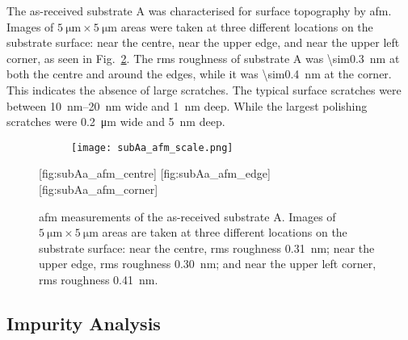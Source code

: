 The as-received substrate A was characterised for surface topography by \ac{afm}. Images of $\SI{5}{\micro\metre}\times\SI{5}{\micro\metre}$ areas were taken at three different locations on the substrate surface: near the centre, near the upper edge, and near the upper left corner, as seen in Fig.~\ref{fig:subAa_afm}. The \ac{rms} roughness of substrate A was \SI{\sim0.3}{\nano\metre} at both the centre and around the edges, while it was \SI{\sim0.4}{\nano\metre} at the corner. This indicates the absence of large scratches. The typical surface scratches were between \SIrange{10}{20}{\nano\metre} wide and \SI{1}{\nano\metre} deep. While the largest polishing scratches were \SI{0.2}{\micro\metre} wide and \SI{5}{\nano\metre} deep.

\begin{figure}[htbp]
    \centering
    \begin{subfigure}[c]{0.032\linewidth}
        \label{fig:subAa_afm_scale}\captionsetup{list=no}
        \texttt{[image: subAa\_afm\_scale.png]}
    \end{subfigure}
    \hfill
    [fig:subAa_afm_centre]
    \hfill
    [fig:subAa_afm_edge]%
    \hfill
    [fig:subAa_afm_corner]%
    \caption[\Ac{afm} of as-received substrate A.]{\Ac{afm} measurements of the as-received substrate A. Images of $\SI{5}{\micro\metre}\times\SI{5}{\micro\metre}$ areas are taken at three different locations on the substrate surface:  near the centre, \ac{rms} roughness \SI{0.31}{\nano\metre};  near the upper edge, \ac{rms} roughness \SI{0.30}{\nano\metre}; and  near the upper left corner, \ac{rms} roughness \SI{0.41}{\nano\metre}.}\label{fig:subAa_afm}
\end{figure} %


\subsection{Impurity Analysis}

